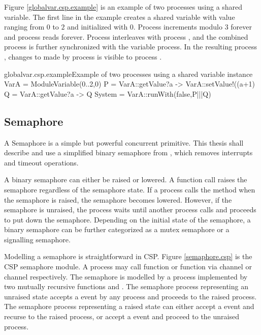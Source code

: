 \documentclass[a4paper, 12pt]{article}
\begin{document}
Figure \ref{globalvar.csp.example} is an example of two processes using a shared variable. The first line in the example creates a shared variable  with value ranging from $0$ to $2$ and initialized with $0$. Process  increments  modulo $3$ forever and process  reads  forever. Process  interleaves with process , and the combined process is further synchronized with the variable  process. In the resulting process , changes to  made by process  is visible to process .

\begin{cspfloat}{globalvar.csp.example}{Example of two processes using a shared variable}
instance VarA = ModuleVariable({0..2},0)
P = VarA::getValue?a -> VarA::setValue!((a+1)%
Q = VarA::getValue?a -> Q
System = VarA::runWith(false,P|||Q)
\end{cspfloat}


\subsection{Semaphore}
A Semaphore is a simple but powerful concurrent primitive. This thesis shall describe and use a simplified binary semaphore from \cite{CPinJava}, which removes interrupts and timeout operations. 

A binary semaphore can either be raised or lowered. A  function call raises the semaphore regardless of the semaphore state. If a process calls the  method when the semaphore is raised, the semaphore becomes lowered. However, if the semaphore is unraised, the process waits until another process calls  and proceeds to put down the semaphore. Depending on the initial state of the semaphore, a binary semaphore can be further categorized as a mutex semaphore or a signalling semaphore.

Modelling a semaphore is straightforward in CSP. Figure \ref{semaphore.csp} is the CSP semaphore module. A process may call  function or  function via channel  or channel  respectively. The semaphore is modelled by a process implemented by two mutually recursive functions  and . The semaphore process representing an unraised state accepts a  event by any process and proceeds to the raised process. The semaphore process representing a raised state can either accept a  event and recurse to the raised process, or accept a  event and proceed to the unraised process.
\end{document}
